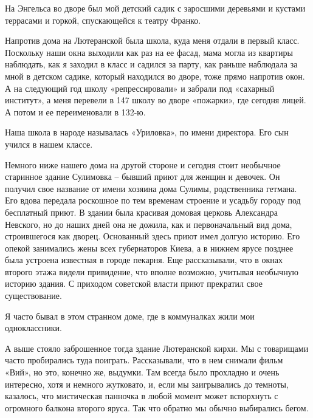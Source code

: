 На Энгельса во дворе был мой детский садик с заросшими деревьями и кустами
террасами и горкой, спускающейся к театру Франко.

Напротив дома на Лютеранской была школа, куда меня отдали в первый класс.
Поскольку наши окна выходили как раз на ее фасад, мама могла из квартиры
наблюдать, как я заходил в класс и садился за парту, как раньше наблюдала за
мной в детском садике, который находился во дворе, тоже прямо напротив окон. А
на следующий год школу «репрессировали» и забрали под «сахарный институт», а
меня перевели в 147 школу во дворе «пожарки», где сегодня лицей. А потом и ее
переименовали в 132-ю.

Наша школа в народе называлась «Уриловка», по имени директора. Его сын учился в
нашем классе.

Немного ниже нашего дома на другой стороне и сегодня стоит необычное старинное
здание Сулимовка – бывший приют для женщин и девочек. Он получил свое название
от имени хозяина дома Сулимы, родственника гетмана. Его вдова передала
роскошное по тем временам строение и усадьбу городу под бесплатный приют. В
здании была красивая домовая церковь Александра Невского, но до наших дней она
не дожила, как и первоначальный вид дома, строившегося как дворец. Основанный
здесь приют имел долгую историю. Его опекой занимались жены всех губернаторов
Киева, а в нижнем ярусе позднее была устроена известная в городе пекарня. Еще
рассказывали, что в окнах второго этажа видели привидение, что вполне возможно,
учитывая необычную историю здания. С приходом советской власти приют прекратил
свое существование.

Я часто бывал в этом странном доме, где в коммуналках жили мои одноклассники. 

А выше стояло заброшенное тогда здание Лютеранской кирхи. Мы с товарищами часто
пробирались туда поиграть. Рассказывали, что в нем снимали фильм «Вий», но это,
конечно же, выдумки. Там всегда было прохладно и очень интересно, хотя и
немного жутковато, и, если мы заигрывались до темноты, казалось, что
мистическая панночка в любой момент может вспорхнуть с огромного балкона
второго яруса. Так что обратно мы обычно выбирались бегом.

\raggedcolumns
\begin{multicols}{3} %
\setlength{\parindent}{0pt}





\end{multicols} %

